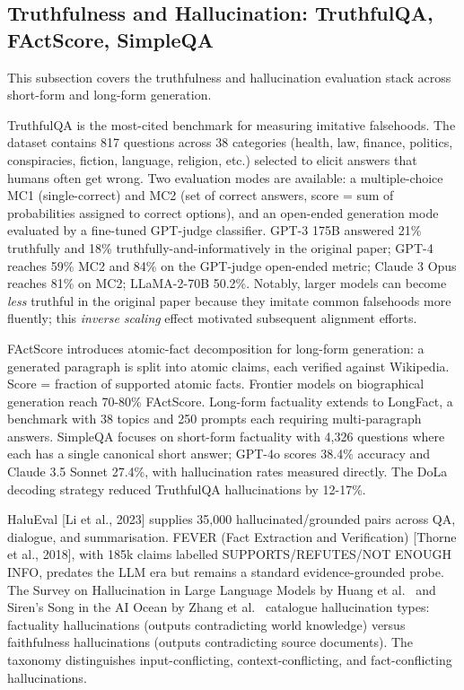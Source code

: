 \documentclass{article}
\begin{document}
\subsection{Truthfulness and Hallucination: TruthfulQA, FActScore, SimpleQA}\label{truthfulness-and-hallucination-truthfulqa-factscore-simpleqa}

This subsection covers the truthfulness and hallucination evaluation stack across short-form and long-form generation.

TruthfulQA \cite{lin2022truthfulqameasurin} is the most-cited benchmark for measuring imitative falsehoods. The dataset contains 817 questions across 38 categories (health, law, finance, politics, conspiracies, fiction, language, religion, etc.) selected to elicit answers that humans often get wrong. Two evaluation modes are available: a multiple-choice MC1 (single-correct) and MC2 (set of correct answers, score = sum of probabilities assigned to correct options), and an open-ended generation mode evaluated by a fine-tuned GPT-judge classifier. GPT-3 175B answered 21\% truthfully and 18\% truthfully-and-informatively in the original paper; GPT-4 reaches 59\% MC2 and 84\% on the GPT-judge open-ended metric; Claude 3 Opus reaches 81\% on MC2; LLaMA-2-70B 50.2\%. Notably, larger models can become \emph{less} truthful in the original paper because they imitate common falsehoods more fluently; this \emph{inverse scaling} effect motivated subsequent alignment efforts.

FActScore \cite{min2023factscorefinegrain} introduces atomic-fact decomposition for long-form generation: a generated paragraph is split into atomic claims, each verified against Wikipedia. Score = fraction of supported atomic facts. Frontier models on biographical generation reach 70-80\% FActScore. Long-form factuality \cite{wei20242024} extends to LongFact, a benchmark with 38 topics and 250 prompts each requiring multi-paragraph answers. SimpleQA \cite{wei20242024} focuses on short-form factuality with 4,326 questions where each has a single canonical short answer; GPT-4o scores 38.4\% accuracy and Claude 3.5 Sonnet 27.4\%, with hallucination rates measured directly. The DoLa decoding strategy \cite{chuang20232023} reduced TruthfulQA hallucinations by 12-17\%.

HaluEval {[}Li et al., 2023{]} supplies 35,000 hallucinated/grounded pairs across QA, dialogue, and summarisation. FEVER (Fact Extraction and Verification) {[}Thorne et al., 2018{]}, with 185k claims labelled SUPPORTS/REFUTES/NOT ENOUGH INFO, predates the LLM era but remains a standard evidence-grounded probe. The Survey on Hallucination in Large Language Models by Huang et al.~\cite{huang20232023} and Siren's Song in the AI Ocean by Zhang et al.~\cite{zhang20232023} catalogue hallucination types: factuality hallucinations (outputs contradicting world knowledge) versus faithfulness hallucinations (outputs contradicting source documents). The taxonomy distinguishes input-conflicting, context-conflicting, and fact-conflicting hallucinations.
\end{document}
